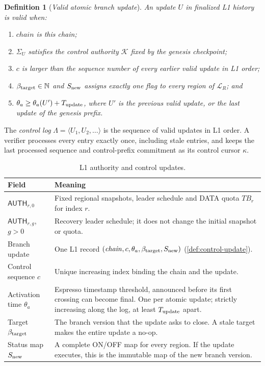 \documentclass[11pt,a4paper]{article}
\newcommand{\TB}{\mathit{TB}}
\newcommand{\tagg}[1]{\ensuremath{\mathsf{#1}}}
\newcommand{\defterm}[1]{\textcolor{rrBlue}{\textit{#1}}}
\newtheorem{definition}{Definition}[section]
\begin{document}
\begin{definition}[\defterm{Valid atomic branch update}]
\label{def:control-valid}
An update $U$ in finalized L1 history is valid when:
\begin{enumerate}[label=(V\arabic*)]
\item $\mathit{chain}$ is this chain;
\item $\Sigma_U$ satisfies the control authority $\mathcal K$ fixed by
the genesis checkpoint;
\item $c$ is larger than the sequence number of every earlier valid
update in L1 order;
\item $\beta_{\rm target}\in\mathbb N$ and $S_{\rm new}$ assigns exactly
one flag to every region of $\mathcal L_R$; and
\item $\theta_a\ge\theta_a(U')+T_{\rm update}$, where $U'$ is the
previous valid update, or the last update of the genesis prefix.
\end{enumerate}
\end{definition}

The \defterm{control log} $\Lambda=\langle U_1,U_2,\ldots\rangle$ is the
sequence of valid updates in L1 order. A verifier processes every entry
exactly once, including stale entries, and keeps the last processed
sequence and control-prefix commitment as its control cursor $\kappa$.

\begin{table}[htbp]\centering\small
\caption{L1 authority and control updates.}\label{tab:l1}
\begin{tabularx}{\linewidth}{@{}p{.27\linewidth}Y@{}}\toprule
Field & Meaning\\\midrule
$\tagg{AUTH}_{r,0}$ & Fixed regional snapshots, leader schedule and
DATA quota $\TB_r$ for index $r$.\\
$\tagg{AUTH}_{r,g}$, $g>0$ & Recovery leader schedule; it does not
change the initial snapshot or quota.\\
Branch update & One L1 record
$(\mathit{chain},c,\theta_a,\beta_{\rm target},S_{\rm new})$
(\cref{def:control-update}).\\
Control sequence $c$ & Unique increasing index binding the chain and the
update.\\
Activation time $\theta_a$ & Espresso timestamp threshold, announced
before its first crossing can become final. One per atomic update;
strictly increasing along the log, at least
$T_{\rm update}$ apart.\\
Target $\beta_{\rm target}$ & The branch version that the update asks to
close. A stale target makes the entire update a no-op.\\
Status map $S_{\rm new}$ & A complete ON/OFF map for every region. If
the update executes, this is the immutable map of the new branch
version.\\\bottomrule
\end{tabularx}
\end{table}
\end{document}
